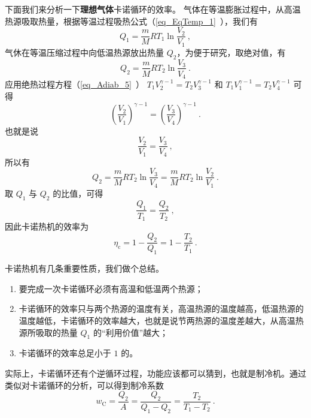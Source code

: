 下面我们来分析一下\textbf{理想气体}卡诺循环的效率。 气体在等温膨胀过程中，从高温热源吸取热量，根据等温过程吸热公式（\autoref{eq_EqTemp_1}~），我们有
\begin{equation}\label{eq_Carnot_1}
Q_{1}=\frac{m}{M} R T_{1} \ln \frac{V_{2}}{V_{1}}~,
\end{equation}
气休在等温压缩过程中向低温热源放出热量 $Q_2$，为便于研究，取绝对值，有
\begin{equation}\label{eq_Carnot_2}
Q_{2}=\frac{m}{M} R T_{2} \ln \frac{V_{3}}{V_{4}}~.
\end{equation}
应用绝热过程方程（\autoref{eq_Adiab_5}~） $T_{1} V_{2}^{\gamma-1}=T_{2} V_{3}^{\gamma-1}$ 和 $T_{1} V_{1}^{\gamma-1}=T_{2} V_{4}^{\gamma-1}$ 可得
\begin{equation}
\left(\frac{V_{2}}{V_{1}}\right)^{\gamma-1}=\left(\frac{V_{3}}{V_{4}}\right)^{\gamma-1}~.
\end{equation}
也就是说
\begin{equation}\label{eq_Carnot_3}
\frac{V_{2}}{V_{1}}=\frac{V_{3}}{V_{4}}~,
\end{equation}
所以有
\begin{equation}
Q_{2}=\frac{m}{M} R T_{2} \ln \frac{V_{3}}{V_{4}}=\frac{m}{M} R T_{2} \ln \frac{V_{2}}{V_{1}}~.
\end{equation}
取 $Q_1$ 与 $Q_2$ 的比值，可得
\begin{equation}\label{eq_Carnot_4}
\frac{Q_{1}}{T_{1}}=\frac{Q_{2}}{T_{2}}~,
\end{equation}
因此卡诺热机的效率为
\begin{equation}
\eta_{\mathrm{c}}=1-\frac{Q_{2}}{Q_{1}}=1-\frac{T_{2}}{T_{1}}~.
\end{equation}

卡诺热机有几条重要性质，我们做个总结。

\begin{enumerate}
\item 要完成一次卡诺循环必须有高温和低温两个热源；
\item 卡诺循环的效率只与两个热源的温度有关，高温热源的温度越高，低温热源的温度越低，卡诺循环的效率越大，也就是说节两热源的温度差越大，从高温热源所吸取的热量 $Q_1$ 的“利用价值”越大；
\item 卡诺循环的效率总足小于 $1 $ 的。
\end{enumerate}

实际上，卡诺循环还有个逆循环过程，功能应该都可以猜到，也就是制冷机。通过类似对卡诺循环的分析，可以得到制冷系数
\begin{equation}
w_{\mathrm{C}}=\frac{Q_{2}}{A}=\frac{Q_{2}}{Q_{1}-Q_{2}}=\frac{T_{2}}{T_{1}-T_{2}}~.
\end{equation}


